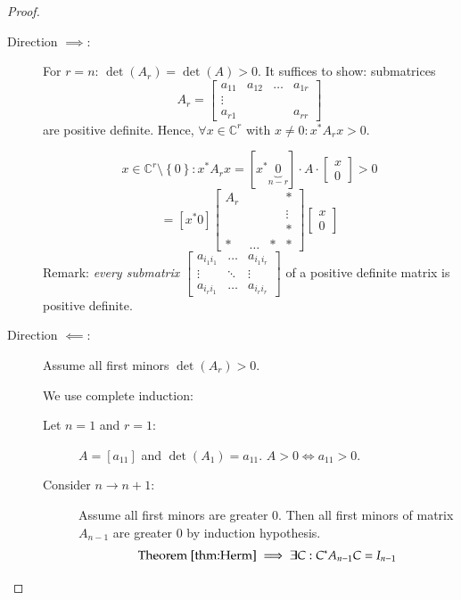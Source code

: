 \documentclass[a4paper]{article}
\numberwithin{lecref}{section}
\newcommand{\set}[1]{\left\{#1\right\}}
\begin{document}
\begin{proof}\hfill{}
  \begin{description}
    \item[Direction $\implies$:] 
      For $r = n$: $\det(A_r) = \det(A) > 0$.
      It suffices to show: submatrices
      \[ A_r = \begin{bmatrix} a_{11} & a_{12} & \ldots & a_{1r} \\ \vdots & & & \\ a_{r1} &  & & a_{rr} \end{bmatrix} \]
      are positive definite.
      Hence, $\forall x \in \mathbb C^r$ with $x \neq 0: x^* A_r x > 0$.

      \[ x \in \mathbb C^r \setminus \set{0}: x^* A_r x = \left[x^* \underbrace{0}_{n - r}\right] \cdot A \cdot \begin{bmatrix} x \\ 0 \end{bmatrix} > 0 \]
      \[ = [x^* 0] \begin{bmatrix} A_r & & & * \\ & & & \vdots \\ & & & * \\ * & \ldots & * & * \end{bmatrix} \begin{bmatrix} x \\ 0\end{bmatrix} \]
      Remark: \emph{every submatrix}
      $\begin{bmatrix} a_{i_1 i_1} & \ldots & a_{i_1 i_r} \\ \vdots & \ddots & \vdots \\ a_{i_r i_1} & \ldots & a_{i_r i_r} \end{bmatrix}$
      of a positive definite matrix is positive definite.
    \item[Direction $\impliedby$:]
      Assume all first minors $\det(A_r) > 0$.

      We use complete induction:
      \begin{description}
        \item[Let $n=1$ and $r=1$:]
          $A = [a_{11}]$ and $\det(A_1) = a_{11}$.
          $A > 0 \iff a_{11} > 0$.
        \item[Consider $n \to n+1$:]
          Assume all first minors are greater $0$.
          Then all first minors of matrix $A_{n-1}$ are greater $0$ by induction hypothesis.
          \[ \text{Theorem~\ref{thm:Herm}} \implies \exists C: C^* A_{n - 1} C = I_{n-1} \]


\end{description}
\end{description}
\end{proof}
\end{document}
